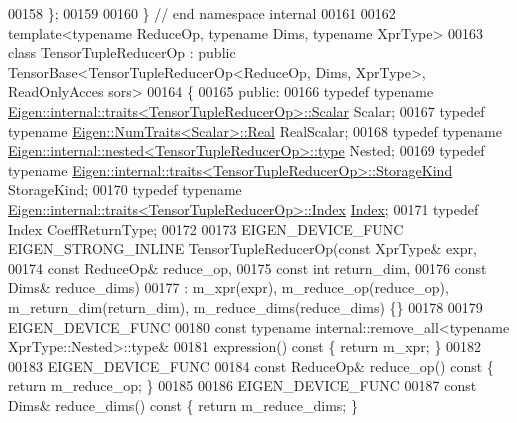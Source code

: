 \begin{DoxyCode}
00158 \};
00159 
00160 \}  \textcolor{comment}{// end namespace internal}
00161 
00162 \textcolor{keyword}{template}<\textcolor{keyword}{typename} ReduceOp, \textcolor{keyword}{typename} Dims, \textcolor{keyword}{typename} XprType>
00163 \textcolor{keyword}{class }TensorTupleReducerOp : \textcolor{keyword}{public} TensorBase<TensorTupleReducerOp<ReduceOp, Dims, XprType>, ReadOnlyAcces
      sors>
00164 \{
00165   \textcolor{keyword}{public}:
00166   \textcolor{keyword}{typedef} \textcolor{keyword}{typename} \hyperlink{struct_eigen_1_1internal_1_1traits}{Eigen::internal::traits<TensorTupleReducerOp>::Scalar}
       Scalar;
00167   \textcolor{keyword}{typedef} \textcolor{keyword}{typename} \hyperlink{group___sparse_core___module}{Eigen::NumTraits<Scalar>::Real} RealScalar;
00168   \textcolor{keyword}{typedef} \textcolor{keyword}{typename} \hyperlink{class_eigen_1_1internal_1_1_tensor_lazy_evaluator_writable}{Eigen::internal::nested<TensorTupleReducerOp>::type}
       Nested;
00169   \textcolor{keyword}{typedef} \textcolor{keyword}{typename} \hyperlink{struct_eigen_1_1internal_1_1traits}{Eigen::internal::traits<TensorTupleReducerOp>::StorageKind}
       StorageKind;
00170   \textcolor{keyword}{typedef} \textcolor{keyword}{typename} \hyperlink{struct_eigen_1_1internal_1_1traits}{Eigen::internal::traits<TensorTupleReducerOp>::Index}
       \hyperlink{namespace_eigen_a62e77e0933482dafde8fe197d9a2cfde}{Index};
00171   \textcolor{keyword}{typedef} Index CoeffReturnType;
00172 
00173   EIGEN\_DEVICE\_FUNC EIGEN\_STRONG\_INLINE TensorTupleReducerOp(\textcolor{keyword}{const} XprType& expr,
00174                                                           \textcolor{keyword}{const} ReduceOp& reduce\_op,
00175                                                           \textcolor{keyword}{const} \textcolor{keywordtype}{int} return\_dim,
00176                                                           \textcolor{keyword}{const} Dims& reduce\_dims)
00177       : m\_xpr(expr), m\_reduce\_op(reduce\_op), m\_return\_dim(return\_dim), m\_reduce\_dims(reduce\_dims) \{\}
00178 
00179   EIGEN\_DEVICE\_FUNC
00180   \textcolor{keyword}{const} \textcolor{keyword}{typename} internal::remove\_all<typename XprType::Nested>::type&
00181   expression()\textcolor{keyword}{ const }\{ \textcolor{keywordflow}{return} m\_xpr; \}
00182 
00183   EIGEN\_DEVICE\_FUNC
00184   \textcolor{keyword}{const} ReduceOp& reduce\_op()\textcolor{keyword}{ const }\{ \textcolor{keywordflow}{return} m\_reduce\_op; \}
00185 
00186   EIGEN\_DEVICE\_FUNC
00187   \textcolor{keyword}{const} Dims& reduce\_dims()\textcolor{keyword}{ const }\{ \textcolor{keywordflow}{return} m\_reduce\_dims; \}

\end{DoxyCode}
